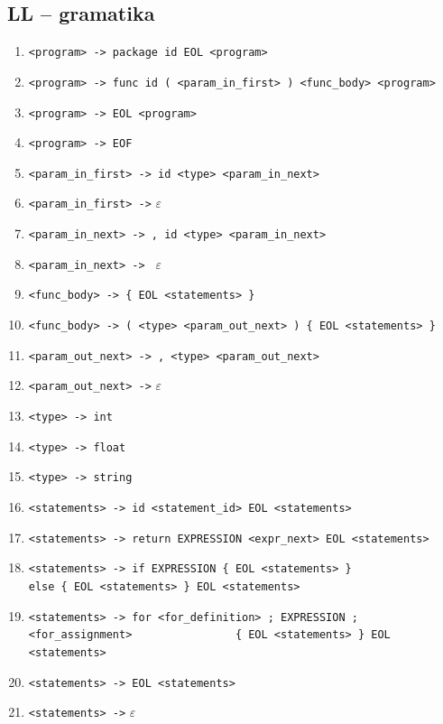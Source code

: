 \documentclass[a4paper, 12pt]{article}
\begin{document}
\newpage

\subsection{LL -- gramatika}

		\begin{enumerate}[noitemsep]
		
            \item \verb|<program> -> package id EOL <program>| 
            \item \verb|<program> -> func id ( <param_in_first> ) <func_body> <program>|
            \item \verb|<program> -> EOL <program>|
            \item \verb|<program> -> EOF |
            
            \item \verb|<param_in_first> -> id <type> <param_in_next> |
            \item \verb|<param_in_first> ->| $\varepsilon$
            \item \verb|<param_in_next> -> , id <type> <param_in_next>|
            \item \verb|<param_in_next> -> | $\varepsilon$
            
            \item \verb|<func_body> -> { EOL <statements> }|
            \item \verb|<func_body> -> ( <type> <param_out_next> ) { EOL <statements> } |
            
            \item \verb|<param_out_next> -> , <type> <param_out_next> |
            \item \verb|<param_out_next> ->| $\varepsilon$
            
            \item \verb|<type> -> int|
            \item \verb|<type> -> float| 
            \item \verb|<type> -> string|
            
            \item \verb|<statements> -> id <statement_id> EOL <statements>|
            \item \verb|<statements> -> return EXPRESSION <expr_next> EOL <statements>|
            \item \verb|<statements> -> if EXPRESSION { EOL <statements> }|\newline \verb|                else { EOL <statements> } EOL <statements>|
            \item \verb|<statements> -> for <for_definition> ; EXPRESSION ; <for_assignment>|\newline \verb|                { EOL <statements> } EOL <statements>|
            \item \verb|<statements> -> EOL <statements>|
            \item \verb|<statements> ->| $\varepsilon$
            

\end{enumerate}
\end{document}
